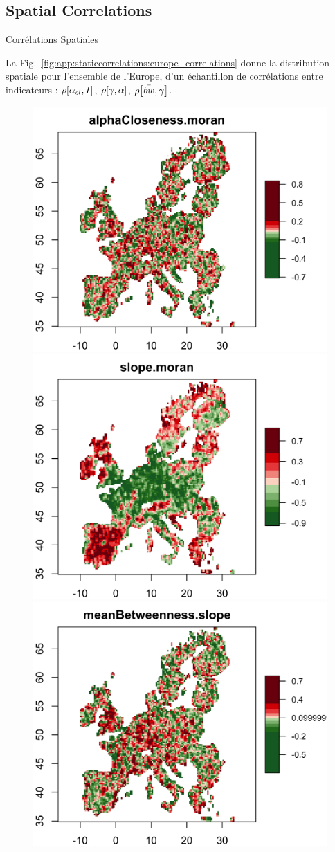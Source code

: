 \subsection{Spatial Correlations}{Corrélations Spatiales}

La Fig.~\ref{fig:app:staticcorrelations:europe_correlations} donne la distribution spatiale pour l'ensemble de l'Europe, d'un échantillon de corrélations entre indicateurs : $\rho\!\left[\alpha_{cl},I\right]$, $\rho\!\left[\gamma,\alpha\right]$, $\rho\!\left[\bar{bw},\gamma\right]$.

\begin{figure}
\includegraphics[width=0.48\linewidth]{Figures/StaticCorrelations/EU_corr_alphaCloseness_moran_rhoasize12}
\includegraphics[width=0.48\linewidth]{Figures/StaticCorrelations/EU_corr_slope_moran_rhoasize12}\\
\includegraphics[width=0.48\linewidth]{Figures/StaticCorrelations/EU_corr_meanBetweenness_slope_rhoasize12}
\end{figure}






